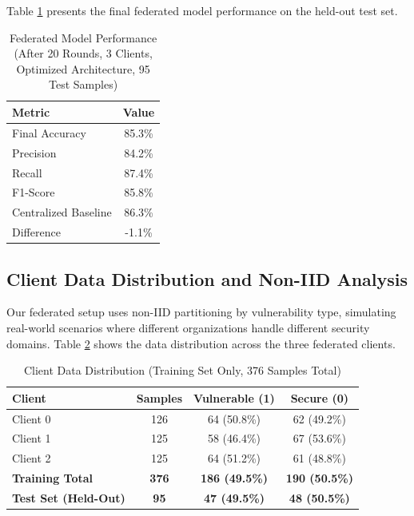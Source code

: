 \documentclass[conference]{IEEEtran}
\begin{document}
Table \ref{tab:federated} presents the final federated model performance on the held-out test set.

\begin{table}[h]
\centering
\caption{Federated Model Performance (After 20 Rounds, 3 Clients, Optimized Architecture, 95 Test Samples)}
\label{tab:federated}
\begin{tabular}{@{}lc@{}}
\toprule
\textbf{Metric} & \textbf{Value} \\ \midrule
Final Accuracy & 85.3\% \\
Precision & 84.2\% \\
Recall & 87.4\% \\
F1-Score & 85.8\% \\
Centralized Baseline & 86.3\% \\
Difference & -1.1\% \\ \bottomrule
\end{tabular}
\end{table}

\subsection{Client Data Distribution and Non-IID Analysis}

Our federated setup uses non-IID partitioning by vulnerability type, simulating real-world scenarios where different organizations handle different security domains. Table \ref{tab:noniid} shows the data distribution across the three federated clients.

\begin{table}[h]
\centering
\caption{Client Data Distribution (Training Set Only, 376 Samples Total)}
\label{tab:noniid}
\begin{tabular}{@{}lccc@{}}
\toprule
\textbf{Client} & \textbf{Samples} & \textbf{Vulnerable (1)} & \textbf{Secure (0)} \\ \midrule
Client 0 & 126 & 64 (50.8\%) & 62 (49.2\%) \\
Client 1 & 125 & 58 (46.4\%) & 67 (53.6\%) \\
Client 2 & 125 & 64 (51.2\%) & 61 (48.8\%) \\
\textbf{Training Total} & \textbf{376} & \textbf{186 (49.5\%)} & \textbf{190 (50.5\%)} \\
\textbf{Test Set (Held-Out)} & \textbf{95} & \textbf{47 (49.5\%)} & \textbf{48 (50.5\%)} \\ \bottomrule
\end{tabular}
\end{table}
\end{document}
